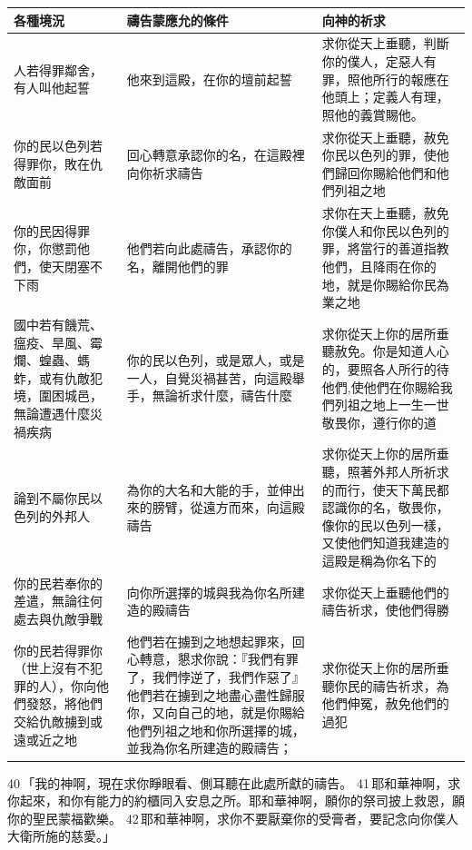 \begin{table}[H]
\centering 
\begin{tabular}{p{4cm}|p{7cm}|p{6.25cm}}\hline\hline
各種境況 & 禱告蒙應允的條件 & 向神的祈求\\\hline\hline
人若得罪鄰舍，有人叫他起誓&    他來到這殿，在你的壇前起誓&求你從天上垂聽，判斷你的僕人，定惡人有罪，照他所行的報應在他頭上；定義人有理，照他的義賞賜他。 \\\hline
你的民以色列若得罪你，敗在仇敵面前&回心轉意承認你的名，在這殿裡向你祈求禱告&求你從天上垂聽，赦免你民以色列的罪，使他們歸回你賜給他們和他們列祖之地  \\\hline
你的民因得罪你，你懲罰他們，使天閉塞不下雨&他們若向此處禱告，承認你的名，離開他們的罪&求你在天上垂聽，赦免你僕人和你民以色列的罪，將當行的善道指教他們，且降雨在你的地，就是你賜給你民為業之地\\\hline
國中若有饑荒、瘟疫、旱風、霉爛、蝗蟲、螞蚱，或有仇敵犯境，圍困城邑，無論遭遇什麼災禍疾病&你的民以色列，或是眾人，或是一人，自覺災禍甚苦，向這殿舉手，無論祈求什麼，禱告什麼&求你從天上你的居所垂聽赦免。你是知道人心的，要照各人所行的待他們,使他們在你賜給我們列祖之地上一生一世敬畏你，遵行你的道\\\hline
論到不屬你民以色列的外邦人&為你的大名和大能的手，並伸出來的膀臂，從遠方而來，向這殿禱告  &求你從天上你的居所垂聽，照著外邦人所祈求的而行，使天下萬民都認識你的名，敬畏你，像你的民以色列一樣，又使他們知道我建造的這殿是稱為你名下的\\\hline
你的民若奉你的差遣，無論往何處去與仇敵爭戰& 向你所選擇的城與我為你名所建造的殿禱告 &求你從天上垂聽他們的禱告祈求，使他們得勝\\\hline
你的民若得罪你（世上沒有不犯罪的人），你向他們發怒，將他們交給仇敵擄到或遠或近之地 & 他們若在擄到之地想起罪來，回心轉意，懇求你說：『我們有罪了，我們悖逆了，我們作惡了』 他們若在擄到之地盡心盡性歸服你，又向自己的地，就是你賜給他們列祖之地和你所選擇的城，並我為你名所建造的殿禱告； &求你從天上你的居所垂聽你民的禱告祈求，為他們伸冤，赦免他們的過犯  \\\hline
\end{tabular}
\end{table}

40 「我的神啊，現在求你睜眼看、側耳聽在此處所獻的禱告。 41 耶和華神啊，求你起來，和你有能力的約櫃同入安息之所。耶和華神啊，願你的祭司披上救恩，願你的聖民蒙福歡樂。 42 耶和華神啊，求你不要厭棄你的受膏者，要記念向你僕人大衛所施的慈愛。」

